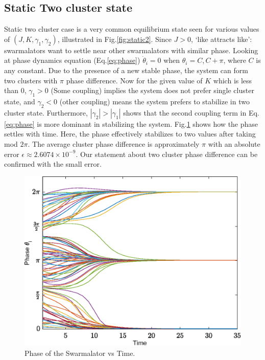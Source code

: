 \documentclass[twocolumn,10pt]{asme2ej}
\begin{document}
{    \subsection{Static Two cluster state}
    {
        \noindent
        Static two cluster case is a very common equilibrium state seen for various values of \((J,K,\gamma_1,\gamma_2)\), illustrated in  Fig.\ref{fig:static2}. Since \(J > 0\), `like attracts like': swarmalators want to settle near other swarmalators with similar phase. Looking at phase dynamics equation (Eq.\ref{eq:phase}) \(\dot{\theta}_{i} = 0\) when \(\theta_i = C, C + \pi \), where \(C\) is any constant. Due to the presence of a new stable phase, the system can form two clusters with \(\pi\) phase difference. Now for the given value of \(K\) which is less than 0, \(\gamma_1 > 0\) (Some coupling) implies the system does not prefer single cluster state, and \(\gamma_2 < 0\) (other coupling) means the system prefers to stabilize in two cluster state. Furthermore, \(|\gamma_2| > |\gamma_1|\) shows that the second coupling term in Eq.\ref*{eq:phase} is more dominant in stabilizing the system. Fig.\ref{fig:phasevsTime} shows how the phase settles with time. Here, the phase effectively stabilizes to two values after taking mod \(2\pi\). The average cluster phase difference is approximately \(\pi\) with an absolute error \(\epsilon \approx 2.6074 \times 10^{-9}\). Our statement about two cluster phase difference can be confirmed with the small error. 

        \begin{figure}
            \includegraphics[width = \linewidth]{phasevstimeN_100.eps}
            \caption{Phase of the Swarmalator vs Time. }
            \label{fig:phasevsTime}
        \end{figure}
    }
    
}
\end{document}
